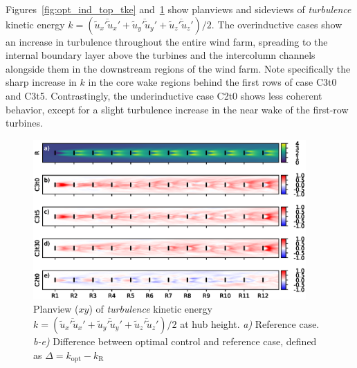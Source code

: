 		Figures~\ref{fig:opt_ind_top_tke} and~\ref{fig:opt_ind_side_tke} show planviews and sideviews of \emph{turbulence} kinetic energy $k = (\overline{\widetilde{u}_x'\widetilde{u}_x'} + \overline{\widetilde{u}_y'\widetilde{u}_y'} + \overline{\widetilde{u}_z'\widetilde{u}_z'})/2$. The overinductive cases show an increase in turbulence throughout the entire wind farm, spreading to the internal boundary layer above the turbines and the intercolumn channels alongside them in the downstream regions of the wind farm. Note specifically the sharp increase in $k$ in the core wake regions behind the first rows of case C3t0 and C3t5. Contrastingly, the underinductive case C2t0 shows less coherent behavior, except for a slight turbulence increase in the near wake of the first-row turbines.
	
		\begin{figure}[ht]
			\centering
			\includegraphics[width=0.93\textwidth]{chapters/optimal_induction_control/topview_tke.eps}
			\caption{Planview ($xy$) of \emph{turbulence} kinetic energy $k = (\overline{\widetilde{u}_x'\widetilde{u}_x'} + \overline{\widetilde{u}_y'\widetilde{u}_y'} + \overline{\widetilde{u}_z'\widetilde{u}_z'})/2$ at hub height. \emph{a) } Reference case. \emph{b-e)} Difference between optimal control and reference case, defined as $\Delta = k_{\text{opt}} - k_{\text{R}}$  \label{fig:opt_ind_side_tke}}
		\end{figure}
	
